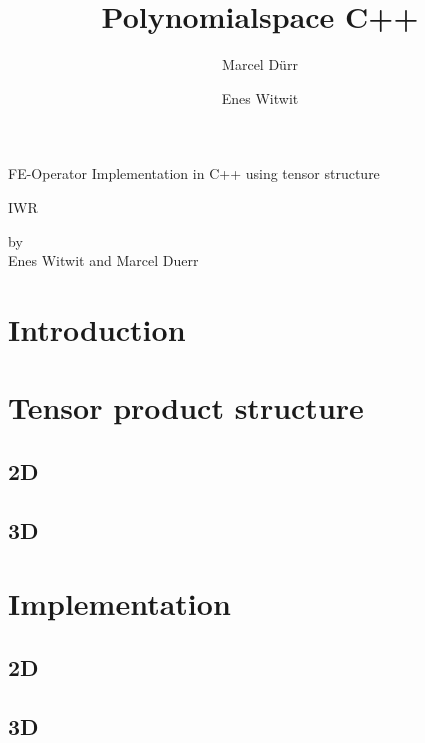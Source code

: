 \documentclass[a4paper,12pt]{report}
\begin{document}
\titleformat{\chapter}[block]{\bf\huge}{\thechapter}{2pc}{}

\title{Polynomialspace C++}

\author{Marcel Dürr \and Enes Witwit}

\pagestyle{empty}




\begin{titlepage}

\begin{center} 
{\Huge FE-Operator Implementation in C++ using tensor structure}
\vspace*{1cm}

{\Large IWR}
\vspace*{1.5cm}

by \\[0.5cm]

{\Large Enes Witwit and Marcel Duerr}
\vspace*{1.5cm}

\end{center}
\end{titlepage}
\tableofcontents
\newpage

\chapter{Introduction}


\chapter{Tensor product structure}
\section{2D}

\section{3D}

\chapter{Implementation}
\section{2D}

\section{3D}
\end{document}
